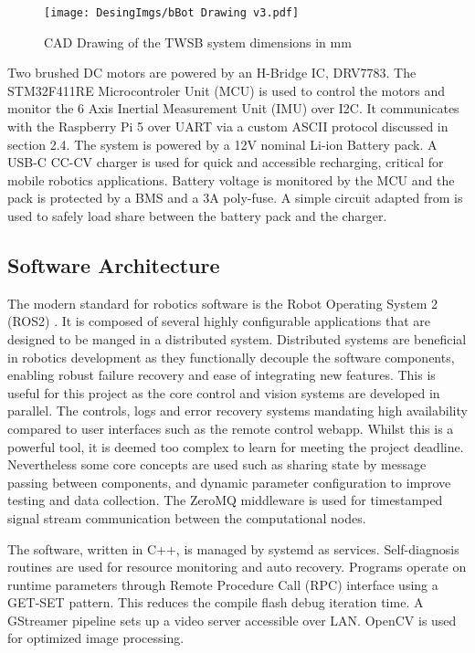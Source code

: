         \begin{figure}[H]
            \texttt{[image: DesingImgs/bBot Drawing v3.pdf]}
            \caption{CAD Drawing of the TWSB system dimensions in mm}
            \label{fig:CAD}
        \end{figure}

        Two brushed DC motors are powered by an H-Bridge IC, DRV7783. 
        The STM32F411RE Microcontroler Unit (MCU) is used to control the 
        motors and monitor the 6 Axis Inertial Measurement Unit (IMU) over I2C. It communicates with the 
        Raspberry Pi 5 over UART via a custom ASCII protocol discussed in section 2.4. 
        The system is powered by a 12V nominal Li-ion Battery pack. A USB-C CC-CV charger is used for quick 
        and accessible recharging, critical for mobile robotics applications. 
        Battery voltage is monitored by the MCU and the pack is protected by a BMS and a 3A poly-fuse.
        A simple circuit adapted from \cite{chu2008designing} is used to safely load share between the battery pack and the charger.

        \subsection{Software Architecture}
        The modern standard for robotics software is the Robot Operating System 2 (ROS2) \cite{Macenski2022RobotOS}. 
        It is composed of several highly configurable applications that are designed to be manged in a distributed system.
        Distributed systems are beneficial in robotics development as they functionally decouple the software components, 
        enabling robust failure recovery and ease of integrating new features. This is useful for this project as 
        the core control and vision systems are developed in parallel. The controls, logs and error recovery systems mandating 
        high availability compared to user interfaces such as the remote control webapp. 
        Whilst this is a powerful tool, it is deemed too complex to learn for meeting the project deadline.
        Nevertheless some core concepts are used such as sharing state by message passing between components, 
        and dynamic parameter configuration to improve testing and data collection. The ZeroMQ middleware is used for 
        timestamped signal stream communication between the computational nodes. 

        The software, written in C++, is managed by systemd as services. 
        Self-diagnosis routines are used for resource monitoring and auto recovery. 
        Programs operate on runtime parameters through Remote Procedure Call (RPC) 
        interface using a GET-SET pattern. This reduces the 
        compile flash debug iteration time. A GStreamer pipeline sets up a video 
        server accessible over LAN. OpenCV is used for optimized image processing.
      
